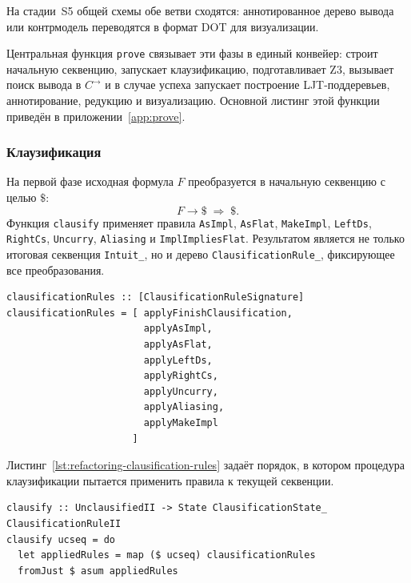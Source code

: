 \documentclass[14pt, russian]{scrartcl}
\begin{document}
На стадии~S5 общей схемы обе ветви сходятся: аннотированное дерево вывода или
контрмодель переводятся в формат DOT для визуализации.

Центральная функция \texttt{prove} связывает эти фазы в единый конвейер:
строит начальную секвенцию, запускает клаузификацию, подготавливает Z3,
вызывает поиск вывода в $C^{\rightarrow}$ и в случае успеха запускает
построение LJT-поддеревьев, аннотирование, редукцию и визуализацию. Основной
листинг этой функции приведён в приложении~\ref{app:prove}.

\subsubsection{Клаузификация}

На первой фазе исходная формула $F$ преобразуется в начальную секвенцию с
целью $\$$:
\[
F \rightarrow \$ \;\Rightarrow\; \$.
\]
Функция \texttt{clausify} применяет правила \texttt{AsImpl},
\texttt{AsFlat}, \texttt{MakeImpl}, \texttt{LeftDs}, \texttt{RightCs},
\texttt{Uncurry}, \texttt{Aliasing} и \texttt{ImplImpliesFlat}. Результатом
является не только итоговая секвенция \texttt{Intuit\_}, но и дерево
\texttt{ClausificationRule\_}, фиксирующее все преобразования.

\begin{listing}[!htb]
\caption{Список правил клаузификации \texttt{clausificationRules}}
\label{lst:refactoring-clausification-rules}
\begin{verbatim}
clausificationRules :: [ClausificationRuleSignature]
clausificationRules = [ applyFinishClausification,
                        applyAsImpl,
                        applyAsFlat,
                        applyLeftDs,
                        applyRightCs,
                        applyUncurry,
                        applyAliasing,
                        applyMakeImpl
                      ]
\end{verbatim}
\end{listing}

Листинг~\ref{lst:refactoring-clausification-rules} задаёт порядок, в котором
процедура клаузификации пытается применить правила к текущей секвенции.

\begin{listing}[!htb]
\caption{Функция клаузификации \texttt{clausify}}
\label{lst:refactoring-clausify}
\begin{verbatim}
clausify :: UnclausifiedII -> State ClausificationState_ ClausificationRuleII
clausify ucseq = do
  let appliedRules = map ($ ucseq) clausificationRules
  fromJust $ asum appliedRules
\end{verbatim}
\end{listing}
\end{document}
